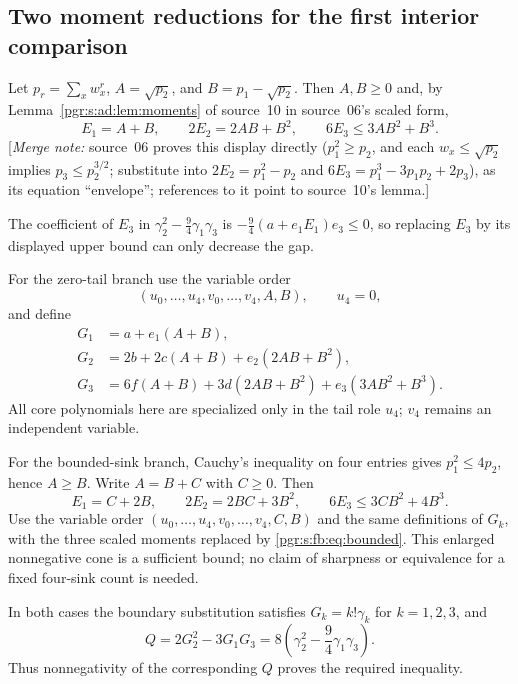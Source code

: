 \documentclass[11pt]{article}
\numberwithin{equation}{section}
\theoremstyle{definition}\newtheorem{definition}[theorem]{Definition}\newtheorem{remark}[theorem]{Remark}
\newcommand{\mnote}[1]{[\textit{Merge note:} #1]}
\begin{document}
\subsection{Two moment reductions for the first interior comparison}

Let $p_r=\sum_xw_x^r$, $A=\sqrt{p_2}$, and $B=p_1-\sqrt{p_2}$. Then $A,B\ge0$ and, by Lemma~\ref{pgr:s:ad:lem:moments} of source~10 in source~06's scaled form,
\[
 E_1=A+B,\qquad 2E_2=2AB+B^2,\qquad 6E_3\le3AB^2+B^3.
\]
\mnote{source~06 proves this display directly ($p_1^2\ge p_2$, and each
$w_x\le\sqrt{p_2}$ implies $p_3\le p_2^{3/2}$; substitute into
$2E_2=p_1^2-p_2$ and $6E_3=p_1^3-3p_1p_2+2p_3$), as its equation
``envelope''; references to it point to source~10's lemma.}

The coefficient of $E_3$ in $\gamma_2^2-\tfrac94\gamma_1\gamma_3$ is
$-\tfrac94(a+e_1E_1)e_3\le0$, so replacing $E_3$ by its displayed upper bound can only decrease the gap.

For the zero-tail branch use the variable order
\[
 (u_0,\ldots,u_4,v_0,\ldots,v_4,A,B),\qquad u_4=0,
\]
and define
\begin{align*}
 G_1&=a+e_1(A+B),\\
 G_2&=2b+2c(A+B)+e_2(2AB+B^2),\\
 G_3&=6f(A+B)+3d(2AB+B^2)+e_3(3AB^2+B^3).
\end{align*}
All core polynomials here are specialized only in the tail role $u_4$; $v_4$ remains an independent variable.

For the bounded-sink branch, Cauchy's inequality on four entries gives $p_1^2\le4p_2$, hence $A\ge B$. Write $A=B+C$ with $C\ge0$. Then
\begin{equation}\label{pgr:s:fb:eq:bounded}
 E_1=C+2B,\qquad 2E_2=2BC+3B^2,\qquad 6E_3\le3CB^2+4B^3.
\end{equation}
Use the variable order $(u_0,\ldots,u_4,v_0,\ldots,v_4,C,B)$ and the same definitions of $G_k$, with the three scaled moments replaced by \eqref{pgr:s:fb:eq:bounded}. This enlarged nonnegative cone is a sufficient bound; no claim of sharpness or equivalence for a fixed four-sink count is needed.

In both cases the boundary substitution satisfies $G_k=k!\gamma_k$ for $k=1,2,3$, and
\begin{equation}\label{pgr:s:fb:eq:Q}
 Q=2G_2^2-3G_1G_3
   =8\left(\gamma_2^2-\frac94\gamma_1\gamma_3\right).
\end{equation}
Thus nonnegativity of the corresponding $Q$ proves the required inequality.
\end{document}
